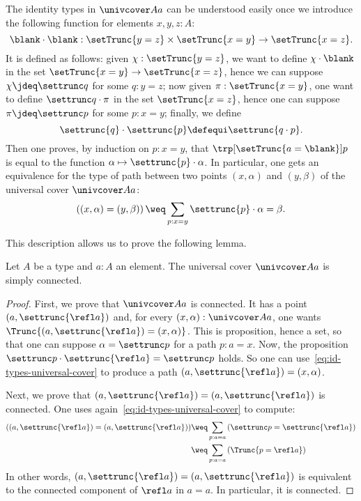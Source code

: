 The identity types in $\univcover A a$ can be understood easily once
we introduce the following function for elements $x,y,z:A$:
\begin{displaymath}
  \blank\cdot\blank : \setTrunc{y=z} \times \setTrunc{x=y} \to \setTrunc{x=z}.
\end{displaymath}
It is defined as follows: given $\chi : \setTrunc{y=z}$, we want to
define $\chi\cdot\blank$ in the set
$\setTrunc{x=y} \to \setTrunc{x=z}$, hence we can suppose
$\chi\jdeq\settrunc q$ for some $q:y=z$; now given
$\pi:\setTrunc{x=y}$, one want to define $\settrunc q \cdot \pi$ in
the set $\setTrunc{x=z}$, hence one can suppose $\pi\jdeq\settrunc p$
for some $p:x=y$; finally, we define
\begin{displaymath}
  \settrunc{q} \cdot \settrunc{p} \defequi \settrunc{q\cdot p}.
\end{displaymath}
Then one proves, by induction on $p:x=y$, that
$\trp[\setTrunc{a=\blank}]p$ is equal to the function
$\alpha\mapsto \settrunc{p}\cdot \alpha$. In particular, one gets an
equivalence for the type of path between two points $(x,\alpha)$ and
$(y,\beta)$ of the universal cover $\univcover A a$:
\begin{equation}
  \label{eq:id-types-universal-cover}%
  \left((x,\alpha) = (y,\beta)\right)
  \weq \sum_{p:x=y}\settrunc{p} \cdot \alpha = \beta.
\end{equation}

This description allows us to prove the following lemma.
\begin{lemma}
  \label{lemma:universal-cover-simply-connected}%
  Let $A$ be a type and $a:A$ an element. The universal cover
  $\univcover A a$ is simply connected.
\end{lemma}
\begin{proof}
  First, we prove that $\univcover A a$ is connected. It has a point
  $(a,\settrunc{\refl a})$ and, for every $(x,\alpha):\univcover A a$, one wants
  $\Trunc{(a,\settrunc{\refl a}) = (x,\alpha)}$. This is proposition, hence a
  set, so that one can suppose $\alpha = \settrunc p$ for a path
  $p:a=x$. Now, the proposition
  $\settrunc p \cdot \settrunc {\refl a} = \settrunc p$ holds. So one
  can use~\cref{eq:id-types-universal-cover} to produce a path
  $(a,\settrunc{\refl a}) = (x,\alpha)$.

  Next, we prove that
  $(a,\settrunc{\refl a}) = (a,\settrunc{\refl a})$ is connected. One
  uses again~\cref{eq:id-types-universal-cover} to compute:
  \begin{align*}
    \left((a,\settrunc{\refl a}) = (a,\settrunc{\refl a})\right)
    &\weq \sum_{p:a=a}\left( \settrunc p = \settrunc{\refl a} \right)
    \\
    &\weq \sum_{p:a=a}\left( \Trunc {p = \refl a} \right)
  \end{align*}
  In other words, $(a,\settrunc{\refl a}) = (a,\settrunc{\refl a})$ is
  equivalent to the connected component of $\refl a$ in $a=a$. In
  particular, it is connected.
\end{proof}

